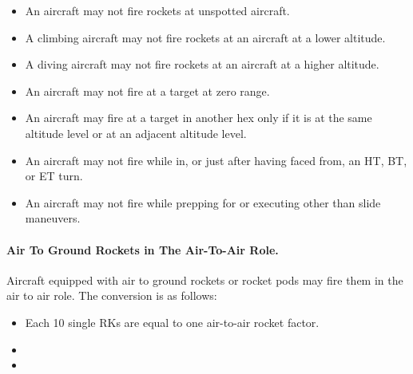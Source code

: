 \begin{itemize}

    \item An aircraft may not fire rockets at unspotted aircraft.

    \item A climbing aircraft may not fire rockets at an aircraft at a lower altitude.

    \item A diving aircraft may not fire rockets at an aircraft at a higher altitude.

    \item An aircraft may not fire at a target at zero range.

    \item An aircraft  may fire at a target in another hex only if it is at the same altitude level or at an adjacent altitude level.

    \item An aircraft may not fire while in, or just after having faced from, an HT, BT, or ET turn.

    \item An aircraft may not fire while prepping for or executing other than slide maneuvers.

\end{itemize}

\paragraph{Air To Ground Rockets in The Air-To-Air Role.} Aircraft equipped with air to ground rockets or rocket pods may fire them in the air to air role. The conversion is as follows:

\begin{itemize}
    \item Each 10 single RKs are equal to one air-to-air rocket factor.	
    \item {}
    \item {}
\end{itemize}


